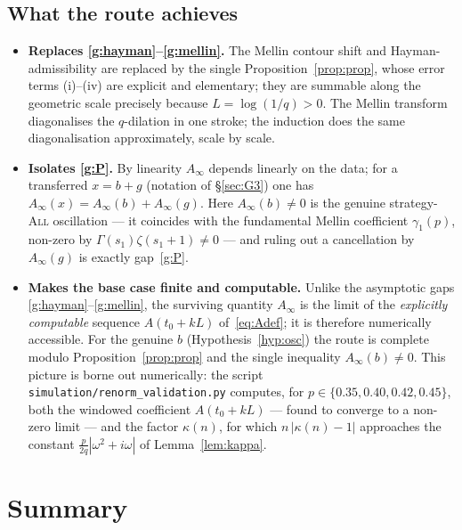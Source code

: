 \documentclass[11pt]{article}
\theoremstyle{definition}
\newcommand{\All}{\textsc{All}}
\begin{document}
\subsection{What the route achieves}

\begin{itemize}[leftmargin=1.6em]
\item \textbf{Replaces \ref{g:hayman}--\ref{g:mellin}.} The Mellin
  contour shift and Hayman-admissibility are replaced by the single
  Proposition~\ref{prop:prop}, whose error terms (i)--(iv) are
  explicit and elementary; they are summable along the geometric
  scale precisely because $L=\log(1/q)>0$. The Mellin transform
  diagonalises the $q$-dilation in one stroke; the induction does the
  same diagonalisation approximately, scale by scale.
\item \textbf{Isolates \ref{g:P}.} By linearity $A_\infty$ depends
  linearly on the data; for a transferred $x=b+g$ (notation of
  \S\ref{sec:G3}) one has $A_\infty(x)=A_\infty(b)+A_\infty(g)$.
  Here $A_\infty(b)\ne0$ is the genuine strategy-\All{} oscillation
  --- it coincides with the fundamental Mellin coefficient
  $\gamma_1(p)$, non-zero by $\Gamma(s_1)\zeta(s_1+1)\ne0$ --- and
  ruling out a cancellation by $A_\infty(g)$ is exactly
  gap~\ref{g:P}.
\item \textbf{Makes the base case finite and computable.} Unlike the
  asymptotic gaps \ref{g:hayman}--\ref{g:mellin}, the surviving
  quantity $A_\infty$ is the limit of the \emph{explicitly
  computable} sequence $A(t_0+kL)$ of~\eqref{eq:Adef}; it is
  therefore numerically accessible. For the genuine $b$
  (Hypothesis~\ref{hyp:osc}) the route is complete modulo
  Proposition~\ref{prop:prop} and the single inequality
  $A_\infty(b)\ne0$. This picture is borne out numerically: the script
  \texttt{simulation/renorm\_validation.py} computes, for
  $p\in\{0.35,0.40,0.42,0.45\}$, both the windowed coefficient
  $A(t_0+kL)$ --- found to converge to a non-zero limit --- and the
  factor $\kappa(n)$, for which $n\,|\kappa(n)-1|$ approaches the
  constant $\tfrac{p}{2q}|\omega^{2}+i\omega|$ of
  Lemma~\ref{lem:kappa}.
\end{itemize}

\section{Summary}\label{sec:summary}
\end{document}
